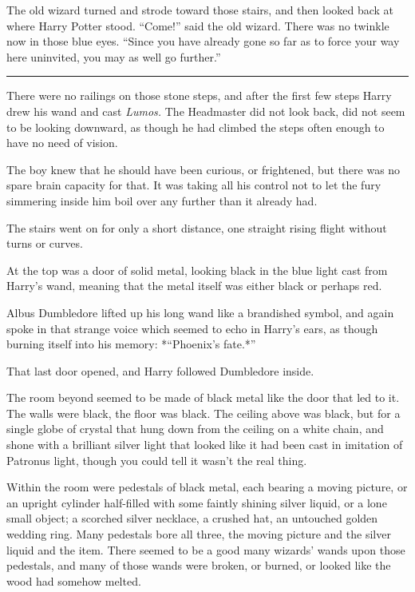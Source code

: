 The old wizard turned and strode toward those stairs, and then looked
back at where Harry Potter stood. ``Come!'' said the old wizard. There
was no twinkle now in those blue eyes. ``Since you have already gone so
far as to force your way here uninvited, you may as well go further.''

\begin{center}\rule{3in}{0.4pt}\end{center}

There were no railings on those stone steps, and after the first few
steps Harry drew his wand and cast \emph{Lumos.} The Headmaster did not
look back, did not seem to be looking downward, as though he had climbed
the steps often enough to have no need of vision.

The boy knew that he should have been curious, or frightened, but there
was no spare brain capacity for that. It was taking all his control not
to let the fury simmering inside him boil over any further than it
already had.

The stairs went on for only a short distance, one straight rising flight
without turns or curves.

At the top was a door of solid metal, looking black in the blue light
cast from Harry's wand, meaning that the metal itself was either black
or perhaps red.

Albus Dumbledore lifted up his long wand like a brandished symbol, and
again spoke in that strange voice which seemed to echo in Harry's ears,
as though burning itself into his memory: *``Phoenix's fate.*''

That last door opened, and Harry followed Dumbledore inside.

The room beyond seemed to be made of black metal like the door that led
to it. The walls were black, the floor was black. The ceiling above was
black, but for a single globe of crystal that hung down from the ceiling
on a white chain, and shone with a brilliant silver light that looked
like it had been cast in imitation of Patronus light, though you could
tell it wasn't the real thing.

Within the room were pedestals of black metal, each bearing a moving
picture, or an upright cylinder half-filled with some faintly shining
silver liquid, or a lone small object; a scorched silver necklace, a
crushed hat, an untouched golden wedding ring. Many pedestals bore all
three, the moving picture and the silver liquid and the item. There
seemed to be a good many wizards' wands upon those pedestals, and many
of those wands were broken, or burned, or looked like the wood had
somehow melted.

